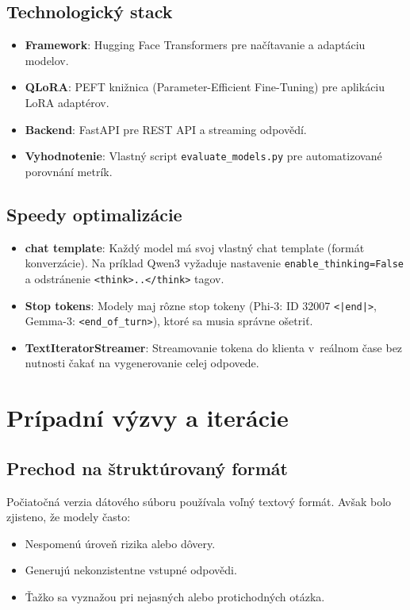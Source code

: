 \subsection{Technologický stack}
\begin{itemize}
    \item \textbf{Framework}: Hugging Face Transformers pre načítavanie a adaptáciu modelov.
    \item \textbf{QLoRA}: PEFT knižnica (Parameter-Efficient Fine-Tuning) pre aplikáciu LoRA adaptérov.
    \item \textbf{Backend}: FastAPI pre REST API a streaming odpovědí.
    \item \textbf{Vyhodnotenie}: Vlastný script \texttt{evaluate\_models.py} pre automatizované porovnání metrík.
\end{itemize}

\subsection{Speedy optimalizácie}
\begin{itemize}
    \item \textbf{chat template}: Každý model má svoj vlastný chat template (formát konverzácie). Na príklad Qwen3 vyžaduje nastavenie \texttt{enable\_thinking=False} a odstránenie \texttt{<think>..</think>} tagov.

    \item \textbf{Stop tokens}: Modely maj rôzne stop tokeny (Phi-3: ID 32007 \texttt{<|end|>}, Gemma-3: \texttt{<end\_of\_turn>}), ktoré sa musia správne ošetriť.

    \item \textbf{TextIteratorStreamer}: Streamovanie tokena do klienta v~reálnom čase bez nutnosti čakať na vygenerovanie celej odpovede.
\end{itemize}


\section{Prípadní výzvy a iterácie}

\subsection{Prechod na štruktúrovaný formát}

Počiatočná verzia dátového súboru používala voľný textový formát. Avšak bolo zjisteno, že modely často:
\begin{itemize}
    \item Nespomenú úroveň rizika alebo dôvery.
    \item Generujú nekonzistentne vstupné odpovědi.
    \item Ťažko sa vyznažou pri nejasných alebo protichodných otázka.
\end{itemize}


